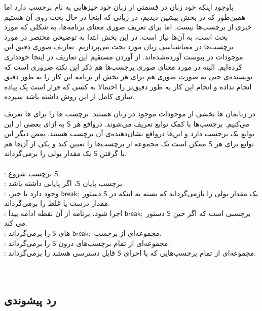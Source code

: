 با‌وجود اینکه خود زبان  در قسمتی از زبان خود چیز‌هایی به نام برچسب دارد اما همین‌طور که در بخش پیشین دیدیم، در زبانی که اینجا در حال بحث روی آن هستیم خبری از برچسب‌ها نیست. اما برای تعریف صوری معنای برنامه‌ها، به شکلی که مورد بحث است، به آن‌ها نیاز است. در این بخش ابتدا به توضیحی مختصر در مورد برچسب‌ها در معناشناسی‌ زبان مورد بحث می‌پردازیم. تعاریف صوری دقیق این موجودات در پیوست \cite{calcul} آورده‌شده‌اند. از آوردن مستقیم این تعاریف در اینجا خود‌داری کرده‌ایم. البته در مورد معنای صوری برجسب‌ها هم ذکر این نکته ضروری است که نویسنده‌ی \cite{calcul} حتی به صورت صوری هم برای هر بخش از برنامه این کار را به طور دقیق انجام نداده و انجام این کار به طور دقیق‌تر را احتمالا به کسی که قرار است یک پیاده سازی کامل از این روش داشته باشد سپرده.


در زبانمان ها بخشی از موجودات موجود در زبان هستند. برچسب ها را برای ها تعریف می‌کنیم. برچسب‌ها با کمک توابع  تعریف می‌شوند. در‌واقع هر $\mathsf{S}$ به ازای بعضی از این توابع یک برجسب دارد و این‌ها در‌واقع نشان‌دهنده‌ی آن برچسب هستند. بعض دیگر این توابع برای هر $\mathsf{S}$ ممکن است یک مجموعه از برچسب‌ها را تعیین‌ کند و یکی از آن‌ها هم با گرفتن $\mathsf{S}$ یک مقدار بولی را بر‌می‌گرداند. 
\\\\
 : برچسب شروع $\mathsf{S}$.\\
 : برچسب پایان $\mathsf{S}$، اگر پایانی داشته باشد.\\
 : یک مقدار بولی را باز‌‌می‌گرداند که بسته به اینکه در $\mathsf{S}$ دستور $\mathsf{break;}$ وجود دارد یا خیر، مقدار درست یا غلط را بر‌می‌گرداند.\\
 : برچسبی است که اگر حین $\mathsf{S}$ دستور $\mathsf{break;}$ اجرا شود، برنامه از آن نقطه ادامه پیدا می کند.\\
 : مجموعه‌ای از برچسب $\mathsf{break;}$ های $\mathsf{S}$ را بر‌می‌گرداند.\\
 : مجموعه‌ای از تمام برچسب‌های درون $\mathsf{S}$ را برمی‌گرداند.\\
 : مجموعه‌ای از تمام بر‌چسب‌هایی که با اجرای $\mathsf{S}$ قابل دسترسی هستند را بر‌می‌گرداند.\\\\\\


\subsection{رد پیشوندی}


